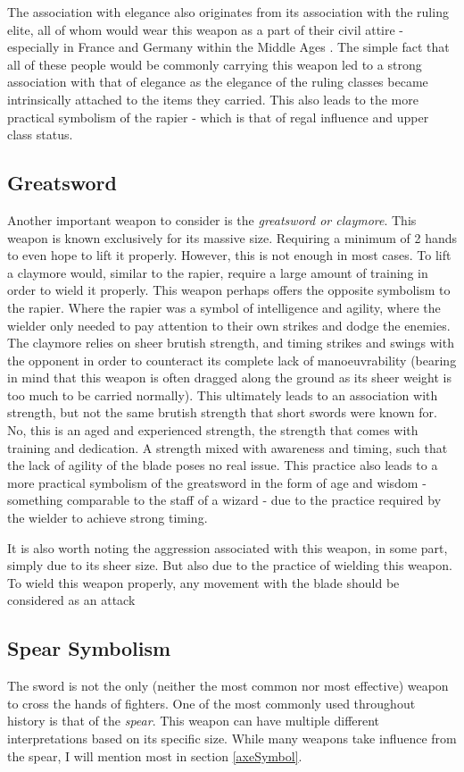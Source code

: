 \documentclass{article}
\begin{document}
The association with elegance also originates from its association with the ruling elite, all of whom would wear this weapon as a part of their civil attire - especially in France and Germany within the Middle Ages \parencite{correa2013history}. The simple fact that all of these people would be commonly carrying this weapon led to a strong association with that of elegance as the elegance of the ruling classes became intrinsically attached to the items they carried. This also leads to the more practical symbolism of the rapier - which is that of regal influence and upper class status.

\subsection*{Greatsword}
Another important weapon to consider is the \emph{greatsword or claymore}. This weapon is known exclusively for its massive size. Requiring a minimum of 2 hands to even hope to lift it properly. However, this is not enough in most cases. To lift a claymore would, similar to the rapier, require a large amount of training in order to wield it properly. This weapon perhaps offers the opposite symbolism to the rapier. Where the rapier was a symbol of intelligence and agility, where the wielder only needed to pay attention to their own strikes and dodge the enemies. The claymore relies on sheer brutish strength, and timing strikes and swings with the opponent in order to counteract its complete lack of manoeuvrability (bearing in mind that this weapon is often dragged along the ground as its sheer weight is too much to be carried normally). This ultimately leads to an association with strength, but not the same brutish strength that short swords were known for. No, this is an aged and experienced strength, the strength that comes with training and dedication. A strength mixed with awareness and timing, such that the lack of agility of the blade poses no real issue. This practice also leads to a more practical symbolism of the greatsword in the form of age and wisdom - something comparable to the staff of a wizard - due to the practice required by the wielder to achieve strong timing.

It is also worth noting the aggression associated with this weapon, in some part, simply due to its sheer size. But also due to the practice of wielding this weapon. To wield this weapon properly, any movement with the blade should be considered as an attack

\subsection{Spear Symbolism} \label{spearSymbol}
The sword is not the only (neither the most common nor most effective) weapon to cross the hands of fighters. One of the most commonly used throughout history is that of the \emph{spear}. This weapon can have multiple different interpretations based on its specific size. While many weapons take influence from the spear, I will mention most in section \ref{axeSymbol}.
\end{document}
